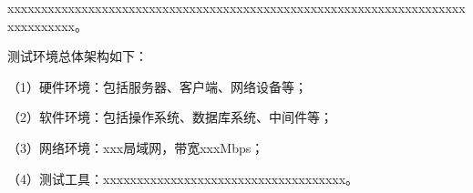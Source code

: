 xxxxxxxxxxxxxxxxxxxxxxxxxxxxxxxxxxxxxxxxxxxxxxxxxxxxxxxxxxxxxxxxxxxxxxxxxxxxxx。

测试环境总体架构如下：

（1）硬件环境：包括服务器、客户端、网络设备等；

（2）软件环境：包括操作系统、数据库系统、中间件等；

（3）网络环境：xxx局域网，带宽xxxMbps；

（4）测试工具：xxxxxxxxxxxxxxxxxxxxxxxxxxxxxxxxxxxx。
